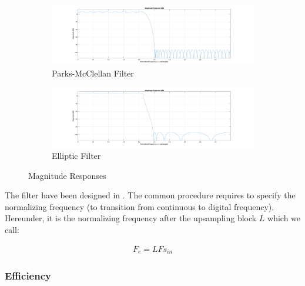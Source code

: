 \begin{figure}[ht]
	\begin{subfigure}[b]{0.5\textwidth}
		\includegraphics[height = 0.5\textwidth, width = 1.2\textwidth]{PM_direct.pdf}
		\caption{Parks-McClellan Filter}
		\label{mgpm}
	\end{subfigure}
	\hfill
	\begin{subfigure}[b]{0.5\textwidth}
		\includegraphics[height = 0.5\textwidth, width = 1.2\textwidth]{Ellip_direct.pdf}
		\caption{Elliptic Filter}
		\label{mgellip}
	\end{subfigure}
	\caption{Magnitude Responses}\label{Figure 3.6}
\end{figure}

\newpage

The filter have been designed in \MATLAB. The common procedure \cite{matlab} requires to specify the normalizing frequency (to transition from continuous to digital frequency). Hereunder, it is the normalizing frequency after the upsampling block $L$ which we call:

\begin{align}
	F_e = LFs_{in} \label{eqn:Fmax}
\end{align}
 
\subsubsection{Efficiency}

